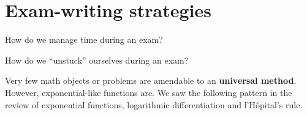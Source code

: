 \documentclass[../main.tex]{subfiles}
\begin{document}
 \section{Exam-writing strategies}
\faComment{} How do we manage time during an exam?

\clearpage

\faComment{} How do we ``unstuck'' ourselves during an exam?

\clearpage

%
%
%
%

\clearpage
Very few math objects or problems are amendable to an \textbf{universal method}. However, exponential-like functions are. We saw the following pattern in the review of exponential functions, logarithmic differentiation and l'H\^opital's rule.
\end{document}
